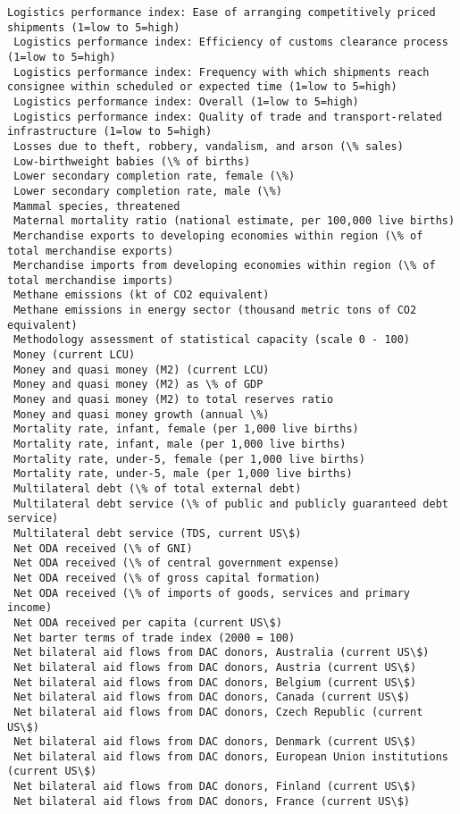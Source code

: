 \documentclass[11pt]{article}
\begin{document}
\begin{Verbatim}[commandchars=\\\{\}]
 Logistics performance index: Ease of arranging competitively priced shipments (1=low to 5=high)
 Logistics performance index: Efficiency of customs clearance process (1=low to 5=high)
 Logistics performance index: Frequency with which shipments reach consignee within scheduled or expected time (1=low to 5=high)
 Logistics performance index: Overall (1=low to 5=high)
 Logistics performance index: Quality of trade and transport-related infrastructure (1=low to 5=high)
 Losses due to theft, robbery, vandalism, and arson (\% sales)
 Low-birthweight babies (\% of births)
 Lower secondary completion rate, female (\%)
 Lower secondary completion rate, male (\%)
 Mammal species, threatened
 Maternal mortality ratio (national estimate, per 100,000 live births)
 Merchandise exports to developing economies within region (\% of total merchandise exports)
 Merchandise imports from developing economies within region (\% of total merchandise imports)
 Methane emissions (kt of CO2 equivalent)
 Methane emissions in energy sector (thousand metric tons of CO2 equivalent)
 Methodology assessment of statistical capacity (scale 0 - 100)
 Money (current LCU)
 Money and quasi money (M2) (current LCU)
 Money and quasi money (M2) as \% of GDP
 Money and quasi money (M2) to total reserves ratio
 Money and quasi money growth (annual \%)
 Mortality rate, infant, female (per 1,000 live births)
 Mortality rate, infant, male (per 1,000 live births)
 Mortality rate, under-5, female (per 1,000 live births)
 Mortality rate, under-5, male (per 1,000 live births)
 Multilateral debt (\% of total external debt)
 Multilateral debt service (\% of public and publicly guaranteed debt service)
 Multilateral debt service (TDS, current US\$)
 Net ODA received (\% of GNI)
 Net ODA received (\% of central government expense)
 Net ODA received (\% of gross capital formation)
 Net ODA received (\% of imports of goods, services and primary income)
 Net ODA received per capita (current US\$)
 Net barter terms of trade index (2000 = 100)
 Net bilateral aid flows from DAC donors, Australia (current US\$)
 Net bilateral aid flows from DAC donors, Austria (current US\$)
 Net bilateral aid flows from DAC donors, Belgium (current US\$)
 Net bilateral aid flows from DAC donors, Canada (current US\$)
 Net bilateral aid flows from DAC donors, Czech Republic (current US\$)
 Net bilateral aid flows from DAC donors, Denmark (current US\$)
 Net bilateral aid flows from DAC donors, European Union institutions (current US\$)
 Net bilateral aid flows from DAC donors, Finland (current US\$)
 Net bilateral aid flows from DAC donors, France (current US\$)

\end{Verbatim}
\end{document}
